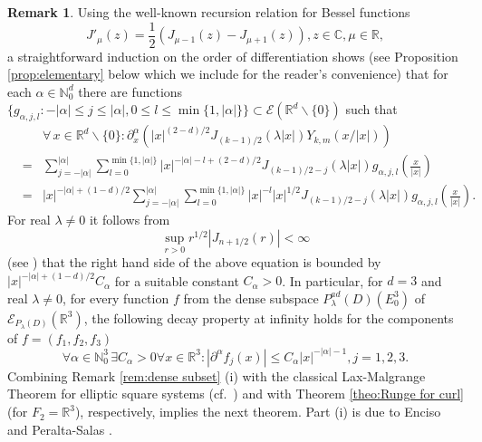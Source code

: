 \documentclass[a4paper,10pt]{amsart}
\newtheorem*{crucial lemma}{Lemma \ref{lem:nice polynomial2}}
\theoremstyle{definition}
\newtheorem{remark}[theorem]{Remark}
\newcommand{\R}{\mathbb{R}}
\newcommand{\C}{\mathbb{C}}
\newcommand{\N}{\mathbb{N}}
\newcommand{\Pad}{P^{ad}}
\begin{document}
\begin{remark}
	Using the well-known recursion relation for Bessel functions
	\[J'_\mu(z)=\frac{1}{2}(J_{\mu-1}(z)-J_{\mu+1}(z)), z\in\C, \mu\in\R,\]
	a straightforward induction on the order of differentiation shows (see Proposition \ref{prop:elementary} below which we include for the reader's convenience) that for each $\alpha\in\N_0^d$ there are functions $\{g_{\alpha,j,l}\colon -|\alpha|\leq j\leq |\alpha|, 0\leq l\leq \min\{1,|\alpha|\}\}\subset \mathscr{E}(\R^d\backslash\{0\})$ such that
	\begin{eqnarray*}
			&&\forall\,x\in\R^d\backslash\{0\}\colon \partial^\alpha_x\left(|x|^{(2-d)/2}J_{(k-1)/2}(\lambda |x|)Y_{k,m}(x/|x|)\right)\\
			&=&\sum_{j=-|\alpha|}^{|\alpha|}\sum_{l=0}^{\min\{1,|\alpha|\}} |x|^{-|\alpha|-l+(2-d)/2}J_{(k-1)/2-j}(\lambda|x|)g_{\alpha,j,l}\left(\frac{x}{|x|}\right)\\
			&=&|x|^{-|\alpha|+(1-d)/2} \sum_{j=-|\alpha|}^{|\alpha|}\sum_{l=0}^{\min\{1,|\alpha|\}} |x|^{-l} |x|^{1/2} J_{(k-1)/2-j}(\lambda|x|)g_{\alpha,j,l}\left(\frac{x}{|x|}\right).
	\end{eqnarray*}
	For real $\lambda\neq 0$ it follows from 
	\[\sup_{r>0} r^{1/2}|J_{n+1/2}(r)|<\infty\]
	(see \cite[\S 7.21]{Watson1944}) that the right hand side of the above equation is bounded by $|x|^{-|\alpha|+(1-d)/2} C_\alpha$ for a suitable constant $C_\alpha>0$. In particular, for $d=3$ and real $\lambda\neq 0$, for every function $f$ from the dense subspace  $\Pad_\lambda(D)(E_0^3)$ of $\mathscr{E}_{P_\lambda(D)}(\R^3)$, the following decay property at infinity holds for the components of $f=(f_1,f_2,f_3)$
	\begin{equation}\label{eq:growth bound for curl}
		\forall\alpha\in\N_0^3\,\exists C_\alpha>0\forall x\in\R^3\colon |\partial^\alpha f_j(x)|\leq C_\alpha |x|^{-|\alpha|-1}, j=1,2,3.
	\end{equation}
	Combining Remark \ref{rem:dense subset} (i) with the classical Lax-Malgrange Theorem for elliptic square systems (cf.~\cite[\enquote{Cas d'un syst\'eme pour lequel $p=q$}, p.~337]{Malgrange1955}) and with Theorem \ref{theo:Runge for curl} (for $F_2=\R^3$), respectively, implies the next theorem. Part (i) is due to Enciso and Peralta-Salas \cite[Theorem 8.3]{EnPe15}.
\end{remark}
\end{document}

